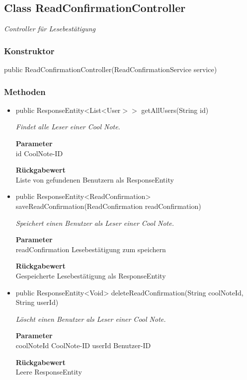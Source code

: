 \documentclass[a4paper]{scrreprt}
\begin{document}
        \subsection{Class ReadConfirmationController}
        \textit{Controller für Lesebestätigung}
        \subsubsection{Konstruktor}
        public ReadConfirmationController(ReadConfirmationService service)
        \subsubsection{Methoden}
        \begin{itemize}
        	\item{public ResponseEntity<List<User$>>$ getAllUsers(String id)}
        	
        	\textit{Findet alle Leser einer Cool Note.}
        	
        	\textbf{Parameter} \\
        	id CoolNote-ID
        	
        	\textbf{Rückgabewert} \\
        	Liste von gefundenen Benutzern als ResponseEntity        \item{public ResponseEntity<ReadConfirmation> saveReadConfirmation(ReadConfirmation readConfirmation)}
        	
        	\textit{Speichert einen Benutzer als Leser einer Cool Note.}
        	
        	\textbf{Parameter} \\
        	readConfirmation Lesebestätigung zum speichern
        	
        	\textbf{Rückgabewert} \\
        	Gespeicherte Lesebestätigung als ResponseEntity        \item{public ResponseEntity<Void> deleteReadConfirmation(String coolNoteId, String userId)}
        	
        	\textit{Löscht einen Benutzer als Leser einer Cool Note.}
        	
        	\textbf{Parameter} \\
        	coolNoteId CoolNote-ID
        	userId Benutzer-ID
        	
        	\textbf{Rückgabewert} \\
        	Leere ResponseEntity
        \end{itemize}
\end{document}

